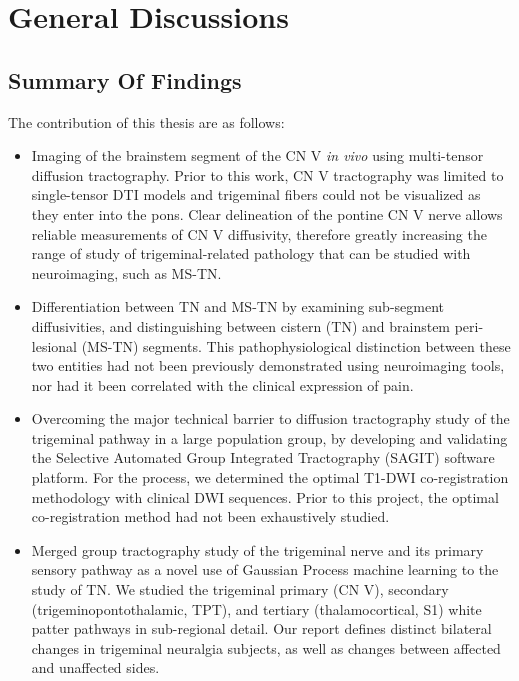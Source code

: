 \graphicspath{{images/discussions/}}

\chapter{General Discussions}

\section{Summary Of Findings}

The contribution of this thesis are as follows:

\begin{itemize}

\item Imaging of the brainstem segment of the CN V \textit{in vivo} using multi-tensor diffusion tractography. Prior to this work, CN V tractography was limited to single-tensor DTI models and trigeminal fibers could not be visualized as they enter into the pons. Clear delineation of the pontine CN V nerve allows reliable measurements of CN V diffusivity, therefore greatly increasing the range of study of trigeminal-related pathology that can be studied with neuroimaging, such as MS-TN. 

\item Differentiation between TN and MS-TN by examining sub-segment diffusivities, and distinguishing between cistern (TN) and brainstem peri-lesional (MS-TN) segments. This pathophysiological distinction between these two entities had not been previously demonstrated using neuroimaging tools, nor had it been correlated with the clinical expression of pain. 

\item Overcoming the major technical barrier to diffusion tractography study of the trigeminal pathway in a large population group, by developing and validating the Selective Automated Group Integrated Tractography (SAGIT) software platform. For the process, we determined the optimal T1-DWI co-registration methodology with clinical DWI sequences. Prior to this project, the optimal co-registration method had not been exhaustively studied.

\item Merged group tractography study of the trigeminal nerve and its primary sensory pathway as a novel use of Gaussian Process machine learning to the study of TN. We studied the trigeminal primary (CN V), secondary (trigeminopontothalamic, TPT), and tertiary (thalamocortical, S1) white patter pathways in sub-regional detail. Our report defines distinct bilateral changes in trigeminal neuralgia subjects, as well as changes between affected and unaffected sides. 

\end{itemize}

